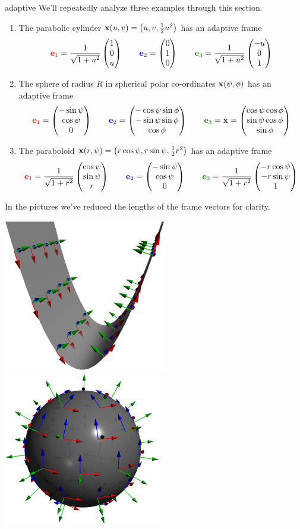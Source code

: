 \begin{examples}{}{adaptive}
We'll repeatedly analyze three examples through this section.
\begin{enumerate}\itemsep0pt
  \item The parabolic cylinder ${\mathbf{x}}(u,v)=\bigl(u,v,\frac 12u^2\bigr)$ has an adaptive frame
	\[
	\textcolor{red}{\ve_1}=\frac 1{\sqrt{1+u^2}}\threevec 10u\qquad \textcolor{blue}{\ve_2}=\threevec 010\qquad \textcolor{Green}{\ve_3}=\frac 1{\sqrt{1+u^2}}\threevec{-u}01
	\]
	\item The sphere of radius $R$ in spherical polar co-ordinates ${\mathbf{x}}(\psi,\phi)$ has an adaptive frame\footnotemark
	\[
	\textcolor{red}{\ve_1}=\threevec{-\sin\psi}{\cos\psi}0\qquad \textcolor{blue}{\ve_2}=\threevec{-\cos\psi\sin\phi}{-\sin\psi\sin\phi}{\cos\phi}\qquad \textcolor{Green}{\ve_3}=\vx=\threevec{\cos\psi\cos\phi}{\sin\psi\cos\phi}{\sin\phi}
	\]
	\item The paraboloid ${\mathbf{x}}(r,\psi)=\bigl(r\cos\psi,r\sin\psi,\frac 12r^2\bigr)$ has an adaptive frame
	\[
	\textcolor{red}{\ve_1}=\frac 1{\sqrt{1+r^2}}\threevec{\cos\psi}{\sin\psi}{r}\qquad \textcolor{blue}{\ve_2}=\threevec{-\sin\psi}{\cos\psi}0\qquad \textcolor{Green}{\ve_3}=\frac 1{\sqrt{1+r^2}}\threevec{-r\cos\psi}{-r\sin\psi}1
	\]
\end{enumerate}
In the pictures we've reduced the lengths of the frame vectors for clarity.
	\begin{center}
	\href{http://www.math.uci.edu/~ndonalds/math162a/moving-paracyl.html}{\includegraphics[scale=0.9]{moving-paracyl}}
	\quad
	\href{http://www.math.uci.edu/~ndonalds/math162a/moving-sphere.html}{\includegraphics[scale=0.9]{moving-sphere}}

\end{center}
\end{examples}
